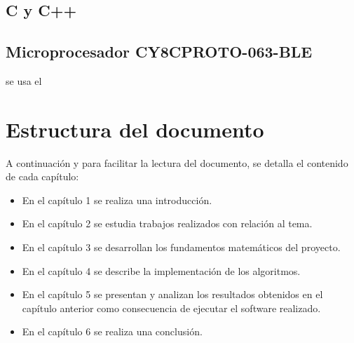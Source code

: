 \subsection{C y C++}

\subsection{Microprocesador CY8CPROTO-063-BLE }
se usa el \cite{CY8CPROTO063BLE}
\section{Estructura del documento}
A continuación y para facilitar la lectura del documento, se detalla el contenido de cada capítulo:

\begin{itemize}
	\item En el capítulo 1 se realiza una introducción.
	\item En el capítulo 2 se estudia trabajos realizados con relación al tema.
	\item En el capítulo 3 se desarrollan los fundamentos matemáticos del proyecto.
	\item En el capítulo 4 se describe la implementación de los algoritmos.
	\item En el capítulo 5 se presentan y analizan los resultados obtenidos en el capítulo anterior como consecuencia de ejecutar el software realizado. 
	\item En el capítulo 6  se realiza una conclusión.
\end{itemize}